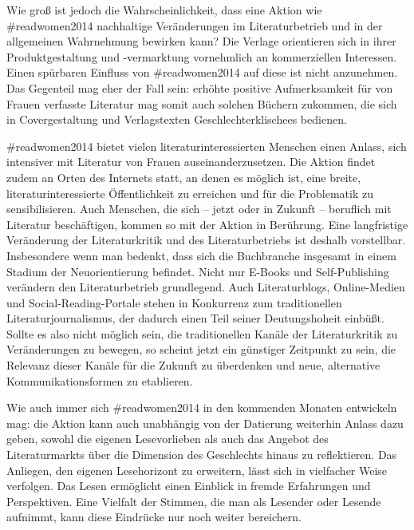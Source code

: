 \documentclass[a4paper,
fontsize=11pt,
oneside,
numbers=noperiodatend,
parskip=half-,
bibliography=totoc,
final
]{scrartcl}
\begin{document}
Wie groß ist jedoch die Wahrscheinlichkeit, dass eine Aktion wie
\#readwomen2014 nachhaltige Veränderungen im Literaturbetrieb und in der
allgemeinen Wahrnehmung bewirken kann? Die Verlage orientieren sich in
ihrer Produktgestaltung und -vermarktung vornehmlich an kommerziellen
Interessen. Einen spürbaren Einfluss von \#readwomen2014 auf diese ist
nicht anzunehmen. Das Gegenteil mag eher der Fall sein: erhöhte positive
Aufmerksamkeit für von Frauen verfasste Literatur mag somit auch solchen
Büchern zukommen, die sich in Covergestaltung und Verlagstexten
Geschlechterklischees bedienen.

\#readwomen2014 bietet vielen literaturinteressierten Menschen einen
Anlass, sich intensiver mit Literatur von Frauen auseinanderzusetzen.
Die Aktion findet zudem an Orten des Internets statt, an denen es
möglich ist, eine breite, literaturinteressierte Öffentlichkeit zu
erreichen und für die Problematik zu sensibilisieren. Auch Menschen, die
sich -- jetzt oder in Zukunft -- beruflich mit Literatur beschäftigen,
kommen so mit der Aktion in Berührung. Eine langfristige Veränderung der
Literaturkritik und des Literaturbetriebs ist deshalb vorstellbar.
Insbesondere wenn man bedenkt, dass sich die Buchbranche insgesamt in
einem Stadium der Neuorientierung befindet. Nicht nur E-Books und
Self-Publishing verändern den Literaturbetrieb grundlegend. Auch
Literaturblogs, Online-Medien und Social-Reading-Portale stehen in
Konkurrenz zum traditionellen Literaturjournalismus, der dadurch einen
Teil seiner Deutungshoheit einbüßt. Sollte es also nicht möglich sein,
die traditionellen Kanäle der Literaturkritik zu Veränderungen zu
bewegen, so scheint jetzt ein günstiger Zeitpunkt zu sein, die Relevanz
dieser Kanäle für die Zukunft zu überdenken und neue, alternative
Kommunikationsformen zu etablieren.

Wie auch immer sich \#readwomen2014 in den kommenden Monaten entwickeln
mag: die Aktion kann auch unabhängig von der Datierung weiterhin Anlass
dazu geben, sowohl die eigenen Lesevorlieben als auch das Angebot des
Literaturmarkts über die Dimension des Geschlechts hinaus zu
reflektieren. Das Anliegen, den eigenen Lesehorizont zu erweitern, lässt
sich in vielfacher Weise verfolgen. Das Lesen ermöglicht einen Einblick
in fremde Erfahrungen und Perspektiven. Eine Vielfalt der Stimmen, die
man als Lesender oder Lesende aufnimmt, kann diese Eindrücke nur noch
weiter bereichern.~
\end{document}
